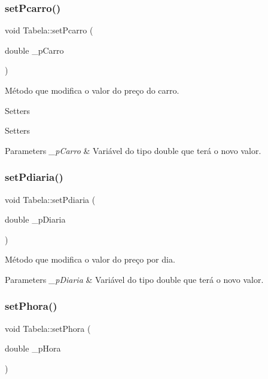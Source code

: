 \subsubsection{\texorpdfstring{set\+Pcarro()}{setPcarro()}}
{\footnotesize\ttfamily void Tabela\+::set\+Pcarro (\begin{DoxyParamCaption}\item[{double}]{\+\_\+p\+Carro }\end{DoxyParamCaption})}



Método que modifica o valor do preço do carro. 

Setters

Setters 
\begin{DoxyParams}{Parameters}
{\em \+\_\+p\+Carro} & Variável do tipo double que terá o novo valor. \\
\hline
\end{DoxyParams}
\mbox{\label{classTabela_aebcda3f64c04af31a5b2b247714234f5}} 
\subsubsection{\texorpdfstring{set\+Pdiaria()}{setPdiaria()}}
{\footnotesize\ttfamily void Tabela\+::set\+Pdiaria (\begin{DoxyParamCaption}\item[{double}]{\+\_\+p\+Diaria }\end{DoxyParamCaption})}



Método que modifica o valor do preço por dia. 


\begin{DoxyParams}{Parameters}
{\em \+\_\+p\+Diaria} & Variável do tipo double que terá o novo valor. \\
\hline
\end{DoxyParams}
\mbox{\label{classTabela_ac105d1c55278046beba287ab8d7d925d}} 
\subsubsection{\texorpdfstring{set\+Phora()}{setPhora()}}
{\footnotesize\ttfamily void Tabela\+::set\+Phora (\begin{DoxyParamCaption}\item[{double}]{\+\_\+p\+Hora }\end{DoxyParamCaption})}



